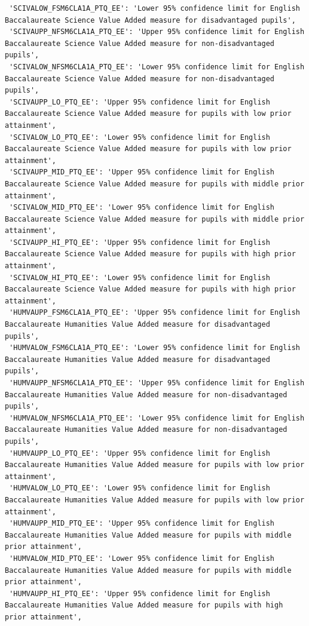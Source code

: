 \documentclass[
  letterpaper,
  DIV=11,
  numbers=noendperiod]{scrartcl}
\begin{document}
\begin{verbatim}
 'SCIVALOW_FSM6CLA1A_PTQ_EE': 'Lower 95% confidence limit for English Baccalaureate Science Value Added measure for disadvantaged pupils',
 'SCIVAUPP_NFSM6CLA1A_PTQ_EE': 'Upper 95% confidence limit for English Baccalaureate Science Value Added measure for non-disadvantaged pupils',
 'SCIVALOW_NFSM6CLA1A_PTQ_EE': 'Lower 95% confidence limit for English Baccalaureate Science Value Added measure for non-disadvantaged pupils',
 'SCIVAUPP_LO_PTQ_EE': 'Upper 95% confidence limit for English Baccalaureate Science Value Added measure for pupils with low prior attainment',
 'SCIVALOW_LO_PTQ_EE': 'Lower 95% confidence limit for English Baccalaureate Science Value Added measure for pupils with low prior attainment',
 'SCIVAUPP_MID_PTQ_EE': 'Upper 95% confidence limit for English Baccalaureate Science Value Added measure for pupils with middle prior attainment',
 'SCIVALOW_MID_PTQ_EE': 'Lower 95% confidence limit for English Baccalaureate Science Value Added measure for pupils with middle prior attainment',
 'SCIVAUPP_HI_PTQ_EE': 'Upper 95% confidence limit for English Baccalaureate Science Value Added measure for pupils with high prior attainment',
 'SCIVALOW_HI_PTQ_EE': 'Lower 95% confidence limit for English Baccalaureate Science Value Added measure for pupils with high prior attainment',
 'HUMVAUPP_FSM6CLA1A_PTQ_EE': 'Upper 95% confidence limit for English Baccalaureate Humanities Value Added measure for disadvantaged pupils',
 'HUMVALOW_FSM6CLA1A_PTQ_EE': 'Lower 95% confidence limit for English Baccalaureate Humanities Value Added measure for disadvantaged pupils',
 'HUMVAUPP_NFSM6CLA1A_PTQ_EE': 'Upper 95% confidence limit for English Baccalaureate Humanities Value Added measure for non-disadvantaged pupils',
 'HUMVALOW_NFSM6CLA1A_PTQ_EE': 'Lower 95% confidence limit for English Baccalaureate Humanities Value Added measure for non-disadvantaged pupils',
 'HUMVAUPP_LO_PTQ_EE': 'Upper 95% confidence limit for English Baccalaureate Humanities Value Added measure for pupils with low prior attainment',
 'HUMVALOW_LO_PTQ_EE': 'Lower 95% confidence limit for English Baccalaureate Humanities Value Added measure for pupils with low prior attainment',
 'HUMVAUPP_MID_PTQ_EE': 'Upper 95% confidence limit for English Baccalaureate Humanities Value Added measure for pupils with middle prior attainment',
 'HUMVALOW_MID_PTQ_EE': 'Lower 95% confidence limit for English Baccalaureate Humanities Value Added measure for pupils with middle prior attainment',
 'HUMVAUPP_HI_PTQ_EE': 'Upper 95% confidence limit for English Baccalaureate Humanities Value Added measure for pupils with high prior attainment',

\end{verbatim}
\end{document}
